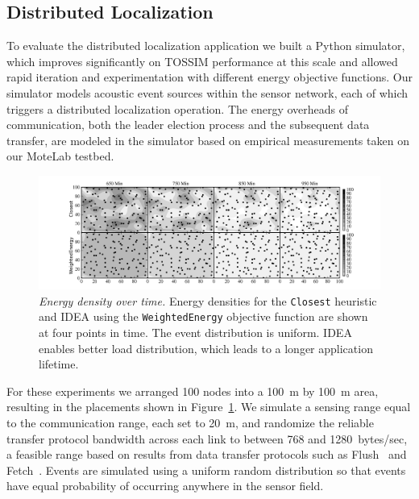 \documentclass{sig-alternate}
\begin{document}
\subsection{Distributed Localization}

To evaluate the distributed localization application we built a Python
simulator, which improves significantly on TOSSIM performance at this scale
and allowed rapid iteration and experimentation with different energy
objective functions. Our simulator models acoustic event sources within the
sensor network, each of which triggers a distributed localization operation.
The energy overheads of communication, both the leader election process and
the subsequent data transfer, are modeled in the simulator based on empirical
measurements taken on our MoteLab testbed.

\begin{figure}[t]
\begin{center}
\includegraphics[width=\hsize]{./figs/graph_density_vs_time0406_2151.png}
\end{center}

\caption{\textit{Energy density over time.} Energy densities for the
\texttt{Closest} heuristic and IDEA using the \texttt{WeightedEnergy}
objective function are shown at four points in time. The event distribution
is uniform. IDEA enables better load distribution, which leads to a longer
application lifetime.}

\label{fig-localizationdensityvtime}
\end{figure}

For these experiments we arranged 100 nodes into a 100~m by 100~m area,
resulting in the placements shown in
Figure~\ref{fig-localizationdensityvtime}. We simulate a sensing range equal
to the communication range, each set to 20~m, and randomize the reliable
transfer protocol bandwidth across each link to between 768 and
1280~bytes/sec, a feasible range based on results from data transfer
protocols such as Flush~\cite{flush-sensys07} and
Fetch~\cite{volcano-osdi06}. Events are simulated using a uniform random
distribution so that events have equal probability of occurring anywhere in
the sensor field.
\end{document}
